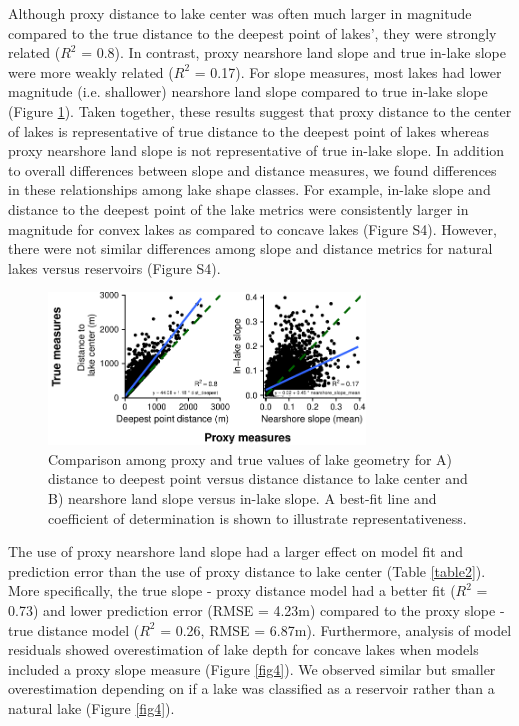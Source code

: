 \documentclass[draft]{agujournal2019}
\begin{document}
Although proxy distance to lake center was often much larger in magnitude compared to the true distance to the deepest point of lakes’, they were strongly related ($R^2$ = 0.8). In contrast, proxy nearshore land slope and true in-lake slope were more weakly related ($R^2$ = 0.17). For slope measures, most lakes had lower magnitude (i.e. shallower) nearshore land slope compared to true in-lake slope (Figure \ref{fig3}). Taken together, these results suggest that proxy distance to the center of lakes is representative of true distance to the deepest point of lakes whereas proxy nearshore land slope is not representative of true in-lake slope. In addition to overall differences between slope and distance measures, we found differences in these relationships among lake shape classes. For example, in-lake slope and distance to the deepest point of the lake metrics were consistently larger in magnitude for convex lakes as compared to concave lakes (Figure S4). However,  there were not similar differences among slope and distance metrics for natural lakes versus reservoirs (Figure S4).

\begin{figure}
  \begin{center}
    \includegraphics[width=0.75\textwidth,keepaspectratio]{../figures/01_geometry_base-1}
  \end{center}
  \caption{Comparison among proxy and true values of lake geometry for A) distance to deepest point versus distance distance to lake center and B) nearshore land slope versus in-lake slope. A best-fit line and coefficient of determination is shown to illustrate representativeness.}\label{fig3}
\end{figure}

The use of proxy nearshore land slope had a larger effect on model fit and prediction error than the use of proxy distance to lake center (Table \ref{table2}). More specifically, the true slope - proxy distance model had a better fit ($R^2$ = 0.73) and lower prediction error (RMSE = 4.23m) compared to the proxy slope - true distance model ($R^2$ = 0.26, RMSE = 6.87m). Furthermore, analysis of model residuals showed overestimation of lake depth for concave lakes when models included a proxy slope measure (Figure \ref{fig4}). We observed similar but smaller overestimation depending on if a lake was classified as a reservoir rather than a natural lake (Figure \ref{fig4}).
\end{document}
